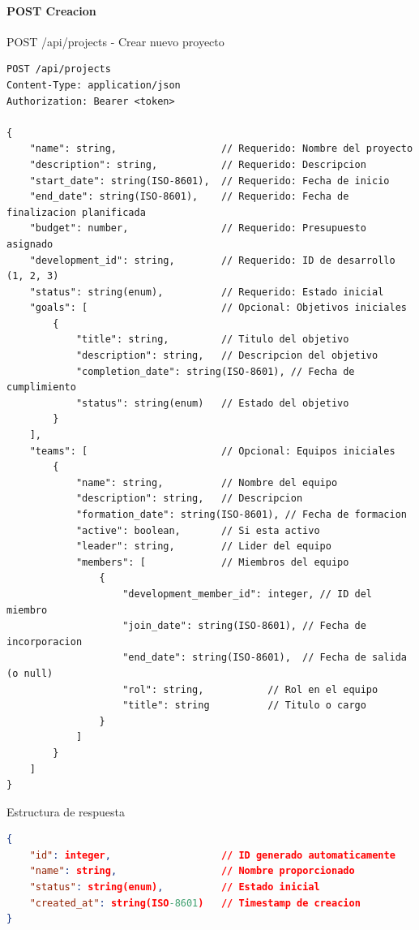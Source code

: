 \documentclass[11pt,a4paper]{article}
\begin{document}
\paragraph{POST Creacion}
\begin{center}
	\begin{minipage}{\textwidth}
		\begin{codebox}{POST /api/projects - Crear nuevo proyecto}
			\begin{lstlisting}[language=HTTP]
POST /api/projects
Content-Type: application/json
Authorization: Bearer <token>

{
    "name": string,                  // Requerido: Nombre del proyecto
    "description": string,           // Requerido: Descripcion
    "start_date": string(ISO-8601),  // Requerido: Fecha de inicio
    "end_date": string(ISO-8601),    // Requerido: Fecha de finalizacion planificada
    "budget": number,                // Requerido: Presupuesto asignado
    "development_id": string,        // Requerido: ID de desarrollo (1, 2, 3)
    "status": string(enum),          // Requerido: Estado inicial
    "goals": [                       // Opcional: Objetivos iniciales
        {
            "title": string,         // Titulo del objetivo
            "description": string,   // Descripcion del objetivo
            "completion_date": string(ISO-8601), // Fecha de cumplimiento
            "status": string(enum)   // Estado del objetivo
        }
    ],
    "teams": [                       // Opcional: Equipos iniciales
        {
            "name": string,          // Nombre del equipo
            "description": string,   // Descripcion
            "formation_date": string(ISO-8601), // Fecha de formacion
            "active": boolean,       // Si esta activo
            "leader": string,        // Lider del equipo
            "members": [             // Miembros del equipo
                {
                    "development_member_id": integer, // ID del miembro
                    "join_date": string(ISO-8601), // Fecha de incorporacion
                    "end_date": string(ISO-8601),  // Fecha de salida (o null)
                    "rol": string,           // Rol en el equipo
                    "title": string          // Titulo o cargo
                }
            ]
        }
    ]
}
\end{lstlisting}
		\end{codebox}
	\end{minipage}
\end{center}

\begin{center}
	\begin{minipage}{\textwidth}
		\begin{codebox}{Estructura de respuesta}
			\begin{lstlisting}[language=json]
{
    "id": integer,                   // ID generado automaticamente
    "name": string,                  // Nombre proporcionado
    "status": string(enum),          // Estado inicial
    "created_at": string(ISO-8601)   // Timestamp de creacion
}
\end{lstlisting}
		\end{codebox}
	\end{minipage}
\end{center}
\end{document}

